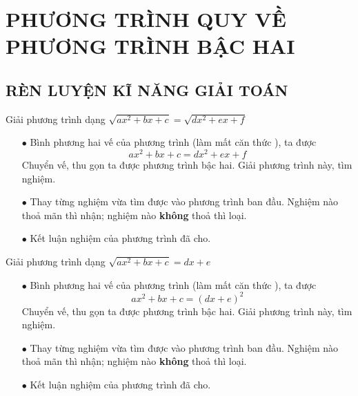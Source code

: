 \section{PHƯƠNG TRÌNH QUY VỀ PHƯƠNG TRÌNH BẬC HAI}

\subsection{RÈN LUYỆN KĨ NĂNG GIẢI TOÁN}
\begin{dang}{Giải phương trình dạng $\sqrt{ax^2+bx+c}=\sqrt{dx^2+ex+f}$}
	\begin{itemize}
		\item [$\bullet$] Bình phương hai vế của phương trình (làm mất căn thức ), ta được
		$$ax^2+bx+c=dx^2+ex+f$$
		Chuyển vế, thu gọn ta được phương trình bậc hai. Giải phương trình này, tìm nghiệm.
		\item [$\bullet$] Thay từng nghiệm vừa tìm được vào phương trình ban đầu. Nghiệm nào thoả mãn thì nhận; nghiệm nào \textbf{không} thoả thì loại.
		\item [$\bullet$] Kết luận nghiệm của phương trình đã cho.
	\end{itemize}
\end{dang}

\begin{dang}{Giải phương trình dạng $\sqrt{ax^2+bx+c}=dx+e$}
	\begin{itemize}
		\item [$\bullet$] Bình phương hai vế của phương trình (làm mất căn thức ), ta được
		$$ax^2+bx+c=(dx+e)^2$$
		Chuyển vế, thu gọn ta được phương trình bậc hai. Giải phương trình này, tìm nghiệm.
		\item [$\bullet$] Thay từng nghiệm vừa tìm được vào phương trình ban đầu. Nghiệm nào thoả mãn thì nhận; nghiệm nào \textbf{không} thoả thì loại.
		\item [$\bullet$] Kết luận nghiệm của phương trình đã cho.
	\end{itemize}
\end{dang}
